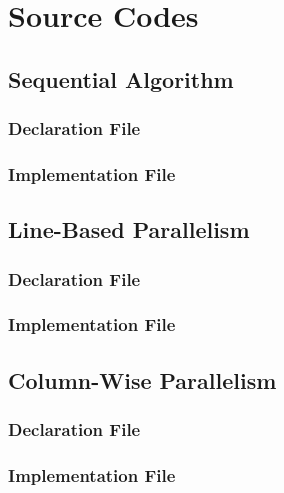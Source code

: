 \documentclass[12pt,oneside]{book} %
\begin{document}
\chapter{Source Codes}
\begin{subappendices}
    \section{Sequential Algorithm}\label{appendix:sequential}
    \subsection{Declaration File}
    
    \subsection{Implementation File}
    

    \section{Line-Based Parallelism}\label{appendix:line-based}
    \subsection{Declaration File}
    
    \subsection{Implementation File}
    

    \section{Column-Wise Parallelism}\label{appendix:column-based}
    \subsection{Declaration File}
    
    \subsection{Implementation File}
    


\end{subappendices}
\end{document}
